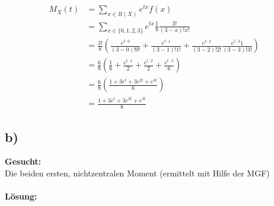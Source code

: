 \documentclass{article}
\begin{document}
\begin{enumerate}[label= zu \roman*)]
\begin{align*}
        M_X(t) &= \sum_{x \in R(X)} e^{tx} f(x) \\
        &= \sum_{x \in \{0,1,2,3\}} e^{tx}\frac{1}{8} \frac{3!}{(3-x)!x!} \\
        &= \frac{3!}{8}(\frac{e^{t\cdot 0}}{(3 -0)!0!} + \frac{e^{t\cdot 1}}{(3 -1)!1!} + \frac{e^{t\cdot 2}}{(3 -2)!2!} \frac{e^{t\cdot 3}1}{(3 -3)!3!}) \\
        &=  \frac{6}{8}(\frac{1}{6} + \frac{e^{t\cdot 1}}{2} + \frac{e^{t\cdot 2}}{2} + \frac{e^{t\cdot 3}}{6}) \\
        &= \frac{6}{8}(\frac{1 + 3e^{t} + 3e^{2t} + e^{3t}}{6}) \\
        &= \frac{1 + 3e^{t} + 3e^{2t} + e^{3t}}{8}
        \end{align*} 
\end{enumerate}

\subsection*{b)}
\textbf{Gesucht:} \\

Die beiden ersten, nichtzentralen Moment (ermittelt mit Hilfe der MGF)\\ \\
\textbf{Lösung:}\\
\end{document}
